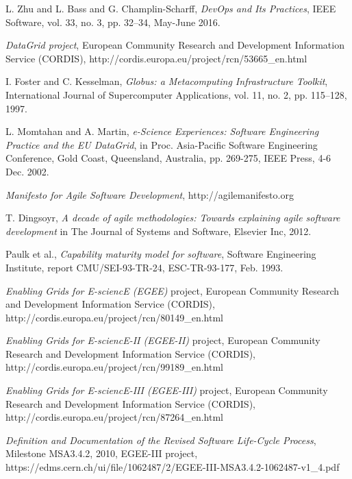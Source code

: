 \documentclass[journal]{IEEEtran}
\begin{document}
\begin{thebibliography}{1}

L. Zhu and L. Bass and G. Champlin-Scharff, \emph{DevOps and Its Practices},
IEEE Software, vol. 33, no. 3, pp. 32--34, May-June 2016.


\emph{DataGrid project}, European Community Research and Development
Information Service (CORDIS),
http://cordis.europa.eu/project/rcn/53665\_en.html

I. Foster and C. Kesselman, \emph{Globus: a Metacomputing Infrastructure
Toolkit}, International Journal of Supercomputer Applications, vol. 11, no. 2,
pp. 115–128, 1997.

L. Momtahan and A. Martin, \emph{e-Science Experiences: Software Engineering
Practice and the EU DataGrid}, in Proc. Asia-Pacific Software Engineering
Conference, Gold Coast, Queensland, Australia, pp. 269-275, IEEE Press,
4-6 Dec. 2002.

\emph{Manifesto for Agile Software Development}, http://agilemanifesto.org

T. Dingsoyr, \emph{A decade of agile methodologies: Towards explaining agile
software development} in The Journal of Systems and Software, Elsevier Inc,
2012.

Paulk et al., \emph{Capability maturity model for software}, Software
Engineering Institute, report CMU/SEI-93-TR-24, ESC-TR-93-177, Feb. 1993.

\emph{Enabling Grids for E-sciencE (EGEE)} project, European Community
Research and Development Information Service (CORDIS),
http://cordis.europa.eu/project/rcn/80149\_en.html

\emph{Enabling Grids for E-sciencE-II (EGEE-II)} project, European Community
Research and Development Information Service (CORDIS),
http://cordis.europa.eu/project/rcn/99189\_en.html

\emph{Enabling Grids for E-sciencE-III (EGEE-III)} project, European Community
Research and Development Information Service (CORDIS),
http://cordis.europa.eu/project/rcn/87264\_en.html

\emph{Definition and Documentation of the Revised Software Life-Cycle Process},
Milestone MSA3.4.2, 2010, EGEE-III project,
https://edms.cern.ch/ui/file/1062487/2/EGEE-III-MSA3.4.2-1062487-v1\_4.pdf


\end{thebibliography}
\end{document}
